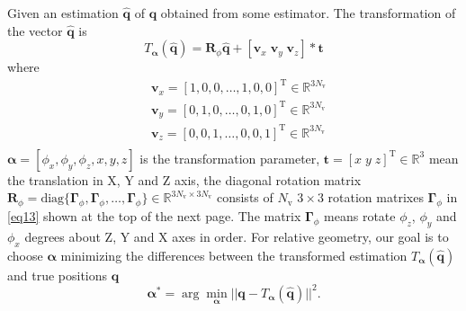 \documentclass{IEEEtran}
\begin{document}
Given an estimation $\hat{\mathbf{q}}$ of $\mathbf{q}$ obtained from some estimator. The transformation of the vector $\hat{\mathbf{q}}$ is
\begin{equation}
T_{\boldsymbol{\alpha}}(\hat{\mathbf{q}})=
\mathbf{R}_{\phi}\hat{\mathbf{q}}+[\mathbf{v}_x\; \mathbf{v}_y\; \mathbf{v}_z]* \mathbf{t}
\end{equation}
where
\begin{equation}\label{eq11}
\begin{aligned}
&\mathbf{v}_x=[1,0,0,\dots,1,0,0]^{\text{T}}\in \mathbb{R}^{3N_{\text{v}}}\\
&\mathbf{v}_y=[0,1,0,\dots,0,1,0]^{\text{T}}\in \mathbb{R}^{3N_{\text{v}}}\\
&\mathbf{v}_z=[0,0,1,\dots,0,0,1]^{\text{T}}\in \mathbb{R}^{3N_{\text{v}}}\\
\end{aligned}
\end{equation}
$\boldsymbol{\alpha}=[\phi_x,\phi_y,\phi_z,x,y,z]$ is the transformation parameter, $\mathbf{t}=[x\; y\; z]^{\text{T}}\in \mathbb{R}^{3}$ mean the translation in X, Y and Z axis, the diagonal rotation matrix $\mathbf{R}_{\phi}=\text{diag}\{\boldsymbol{\Gamma}_{\phi},\boldsymbol{\Gamma}_{\phi},\dots,\boldsymbol{\Gamma}_{\phi}\}\in \mathbb{R}^{3N_{\text{v}}\times 3N_{\text{v}}}$ consists of $N_{\text{v}}$ $3\times 3$ rotation matrixes $\boldsymbol{\Gamma}_{\phi}$ in \eqref{eq13} shown at the top of the next page. The matrix $\boldsymbol{\Gamma}_{\phi}$ means rotate $\phi_z$, $\phi_y$ and $\phi_x$ degrees about Z, Y and X axes in order. For relative geometry, our goal is to choose $\boldsymbol{\alpha}$  minimizing the differences between the transformed estimation $T_{\boldsymbol{\alpha}}(\hat{\mathbf{q}})$ and true positions $\mathbf{q}$
\begin{equation}\label{9}
\boldsymbol{\alpha}^*=\arg\min_{\boldsymbol{\alpha}}
||\mathbf{q}-T_{\boldsymbol{\alpha}}
(\hat{\mathbf{q}})||^2.
\end{equation}
\end{document}
